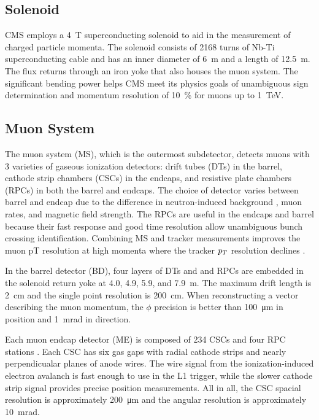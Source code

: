 \documentclass[12pt]{article}
\begin{document}
\subsection{Solenoid}
    CMS employs a \SI{4}{T} superconducting solenoid to aid in the measurement of charged particle momenta. The solenoid consists of \num{2168} turns of Nb-Ti superconducting cable and has an inner diameter of \SI{6}{m} and a length of \SI{12.5}{m}. The flux returns through an iron yoke that also houses the muon system. The significant  bending power helps CMS meet its physics goals of unambiguous sign determination and momentum resolution of \SI{10}{\percent} for muons up to \SI{1}{\tera\electronvolt}.

\subsection{Muon System}
    The muon system (MS), which is the outermost subdetector, detects muons with \num{3} varieties of gaseous ionization detectors: drift tubes (DTs) in the barrel, cathode strip chambers (CSCs) in the endcaps, and resistive plate chambers (RPCs) in both the barrel and endcaps. The choice of detector varies between barrel and endcap due to the difference in neutron-induced background , muon rates, and magnetic field strength. The RPCs are useful in the endcaps and barrel because their fast response and good time resolution allow unambiguous bunch crossing identification. Combining MS and tracker measurements improves the muon pT resolution at high momenta where the tracker $p_T$ resolution declines .

    In the barrel detector (BD), four layers of DTs and and RPCs are embedded in the solenoid return yoke at \num{4.0}, \num{4.9}, \num{5.9}, and \SI{7.9}{m}. The maximum drift length is \SI{2}{\cm} and the single point resolution is \SI{200}{\cm}. When reconstructing a vector describing the muon momentum, the $\phi$ precision is better than \SI{100}{\micro\m} in position and \SI{1}{\milli\radian} in direction. 

    Each muon endcap detector (ME) is composed of \num{234} CSCs and four RPC stations . Each CSC has six gas gaps with radial cathode strips and nearly perpendicualar planes of anode wires. The wire signal from the ionization-induced electron avalanch is fast enough to use in the L1 trigger, while the slower  cathode strip signal provides precise  position measurements. All in all, the CSC spacial resolution is approximately \SI{200}{\micro\m} and the angular resolution is approximately \SI{10}{\milli\radian}.
\end{document}
